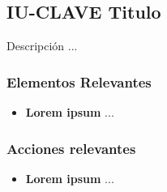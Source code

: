 
\subsection{IU-CLAVE Titulo}

 Descripción ...


\subsubsection{Elementos Relevantes}

    \begin{itemize}
    \item {\bf Lorem ipsum} ...
    \end{itemize}

\subsubsection{Acciones relevantes}

    \begin{itemize}
    \item {\bf Lorem ipsum} ...
    \end{itemize}


